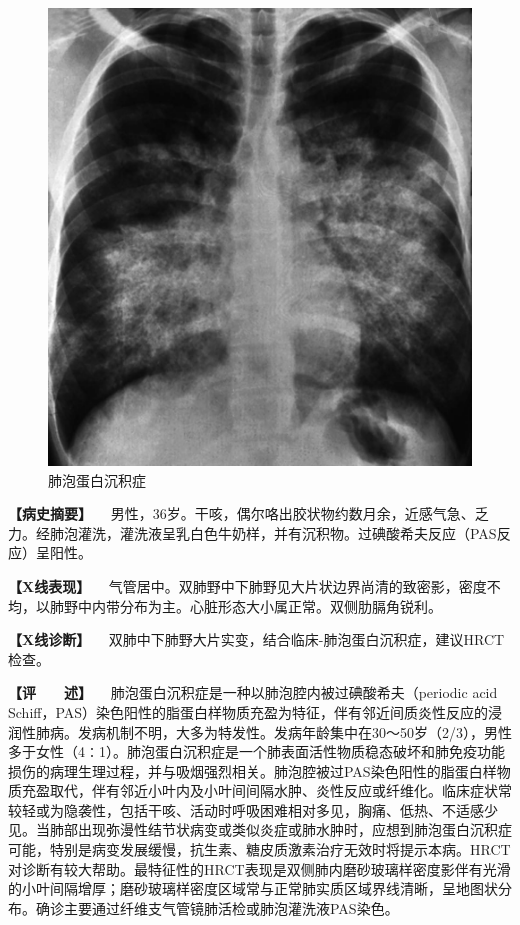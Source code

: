 \begin{figure}[!htbp]
 \centering
 \includegraphics{./images/Image00183.jpg}
 \captionsetup{justification=centering}
 \caption{肺泡蛋白沉积症}
 \label{fig3-10-4}
  \end{figure} 

\textbf{【病史摘要】}
　男性，36岁。干咳，偶尔咯出胶状物约数月余，近感气急、乏力。经肺泡灌洗，灌洗液呈乳白色牛奶样，并有沉积物。过碘酸希夫反应（PAS反应）呈阳性。

\textbf{【X线表现】}
　气管居中。双肺野中下肺野见大片状边界尚清的致密影，密度不均，以肺野中内带分布为主。心脏形态大小属正常。双侧肋膈角锐利。

\textbf{【X线诊断】}
　双肺中下肺野大片实变，结合临床-肺泡蛋白沉积症，建议HRCT检查。

\textbf{【评　　述】}
　肺泡蛋白沉积症是一种以肺泡腔内被过碘酸希夫（periodic acid
Schiff，PAS）染色阳性的脂蛋白样物质充盈为特征，伴有邻近间质炎性反应的浸润性肺病。发病机制不明，大多为特发性。发病年龄集中在30～50岁（2/3），男性多于女性（4∶1）。肺泡蛋白沉积症是一个肺表面活性物质稳态破坏和肺免疫功能损伤的病理生理过程，并与吸烟强烈相关。肺泡腔被过PAS染色阳性的脂蛋白样物质充盈取代，伴有邻近小叶内及小叶间间隔水肿、炎性反应或纤维化。临床症状常较轻或为隐袭性，包括干咳、活动时呼吸困难相对多见，胸痛、低热、不适感少见。当肺部出现弥漫性结节状病变或类似炎症或肺水肿时，应想到肺泡蛋白沉积症可能，特别是病变发展缓慢，抗生素、糖皮质激素治疗无效时将提示本病。HRCT对诊断有较大帮助。最特征性的HRCT表现是双侧肺内磨砂玻璃样密度影伴有光滑的小叶间隔增厚；磨砂玻璃样密度区域常与正常肺实质区域界线清晰，呈地图状分布。确诊主要通过纤维支气管镜肺活检或肺泡灌洗液PAS染色。

